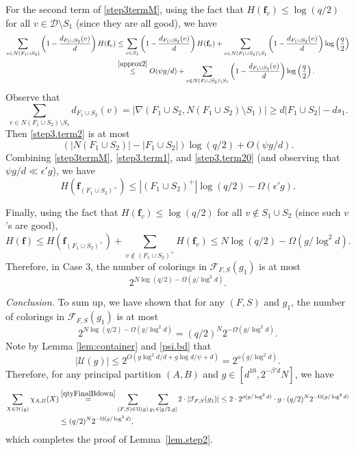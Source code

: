 \documentclass{amsart}
\theoremstyle{definition}
\newcommand{\gO}{\Omega}
\newcommand{\cD}{\mathcal{D} }
\newcommand{\cF}{\mathcal{F} }
\newcommand{\cH}{\mathcal{H} }
\newcommand{\cU}{\mathcal{U} }
\newcommand{\bbf}{\mathbf{f}}
\newcommand{\beq}[1]{\begin{equation}\label{#1}}
\newcommand{\enq}[0]{\end{equation}}
\newcommand{\eps}{\epsilon}
\newcommand{\nin}[0]{\noindent}
\newcommand{\0}[0]{\emptyset}
\begin{document}
For the second term of \eqref{step3termM}, using the fact that $H(\bbf_v) \le \log(q/2)$ for all $v \in \cD \setminus S_1$ (since they are all good), we have
\beq{step3.term2}
\begin{split}
\sum_{v \in N(F_1 \cup S_2)}\left(1-\frac{d_{F_1 \cup S_2}(v)}{d}\right)H(\bbf_v)
&\le \sum_{v\in S_1}\left(1-\frac{d_{F_1 \cup S_2}(v)}{d}\right)H(\bbf_v) + \sum_{v \in N(F_1 \cup S_2) \setminus S_1}\left(1-\frac{d_{F_1 \cup S_2}(v)}{d}\right)\log\left(\frac{q}{2}\right)\\
&\stackrel{\eqref{approx2}}{\le} O(\psi g/d)+ \sum_{v \in N(F_1 \cup S_2) \setminus S_1}\left(1-\frac{d_{F_1 \cup S_2}(v)}{d}\right)\log\left(\frac{q}{2}\right).
\end{split}
\enq
Observe that
\[
\sum_{v \in N(F_1 \cup S_2) \setminus S_1}d_{F_1 \cup S_2}(v)
=|\nabla(F_1 \cup S_2,N(F_1 \cup S_2) \setminus S_1)|
\ge d|F_1 \cup S_2|-ds_1.
\]
Then \eqref{step3.term2} is at most
\beq{step3.term20}
(|N(F_1 \cup S_2)|-|F_1 \cup S_2|)\log(q/2)+O(\psi g/d).
\enq
Combining \eqref{step3termM}, \eqref{step3.term1}, and \eqref{step3.term20} (and observing that $\psi g/d \ll \eps' g$), we have
\[H(\bbf_{(F_1\cup S_2)^+})\le |(F_1\cup S_2)^+|\log(q/2)-\gO(\eps' g).\]

Finally, using the fact that $H(\bbf_v)\le \log(q/2)$ for all $v \notin S_1 \cup S_2$ (since such $v$'s are good),
\[
H(\bbf)\le H(\bbf_{(F_1\cup S_2)^+})+\sum_{v \notin (F_1\cup S_2)^+} H(\bbf_v)
\le N\log (q/2)-\gO(g/\log^2 d). \]
Therefore, in Case 3, the number of colorings in $\cF_{F, S}(g_1)$ is at most \[
2^{N\log (q/2)-\gO(g/\log^{2} d)}.\]





\nin \textit{Conclusion.} 
To sum up, we have shown that for any $(F, S)$ and $g_1$, the number of colorings in $\cF_{F, S}(g_1)$ is at most 
\[2^{N\log (q/2)-\gO(g/\log^{2} d)}=(q/2)^N 2^{-\gO(g/\log^2d)}.\]
Note by Lemma \ref{lem:container} and \eqref{psi.bd} that
\[
|\cU(g)|\leq 2^{O(g\log^2 d/d+g\log d/\psi +d)} = 2^{o(g/\log^2 d)}.
\]
Therefore, for any principal partition $(A, B)$ and $g \in [d^{10}, 2^{-\beta' d}N]$, we have
\[
\begin{split}
\sum_{X\in\cH(g)}\chi_{A, B}(X)
&\stackrel{\eqref{qtyFinalBdown}}{=}\sum_{(F, S)\in \cU(g)}\sum_{g_1\in[g/2, g]}2\cdot |\cF_{F, S}(g_1)|
\le 2\cdot 2^{o(g/\log^2 d)} \cdot g\cdot(q/2)^N2^{-\gO(g/\log^2d)}\\
&\le (q/2)^N 2^{-\gO(g/\log^2 d)},
\end{split}
\]
which completes the proof of Lemma~\ref{lem.step2}.
\end{document}
